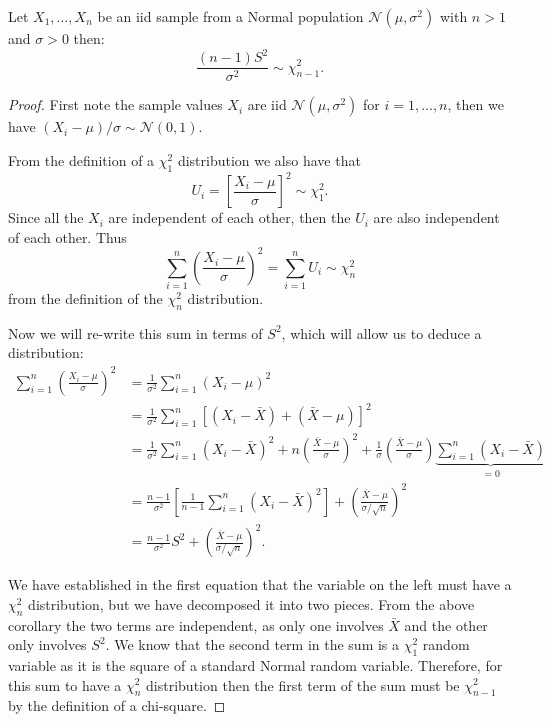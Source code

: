 \documentclass[10pt, a4paper]{article}
\begin{document}
\begin{theorem}
    Let $X_1, \dotsc, X_n$ be an iid sample from a Normal population $\mathcal{N}(\mu, \sigma ^ 2)$ with $n > 1$ and $\sigma > 0$ then:
    \[
    \frac{(n - 1)S ^ 2}{\sigma ^ 2} \sim \chi_{n - 1}^{2}.
    \]

    \begin{proof}
        First note the sample values $X_i$ are iid $\mathcal{N}(\mu, \sigma ^ 2)$ for $i = 1, \dotsc, n$,
        then we have $(X_i - \mu) / \sigma \sim \mathcal{N}(0, 1)$.

        From the definition of a $\chi_{1}^{2}$ distribution we also have that
        \[
        U_i = \left[\frac{X_i - \mu}{\sigma}\right] ^ 2 \sim \chi_{1}^{2}.
        \]
        Since all the $X_i$ are independent of each other,
        then the $U_i$ are also independent of each other.
        Thus
        \[
        \sum_{i = 1}^{n}\left(\frac{X_i - \mu}{\sigma}\right) ^ 2 = \sum_{i = 1}^{n}U_i \sim \chi_{n}^{2}
        \]
        from the definition of the $\chi_{n}^{2}$ distribution.

        Now we will re-write this sum in terms of $S ^ 2$,
        which will allow us to deduce a distribution:
        \begin{align*}
            \sum_{i = 1}^{n}\left(\frac{X_i - \mu}{\sigma}\right) ^ 2 &= \frac{1}{\sigma ^ 2}\sum_{i = 1}^{n}(X_i - \mu) ^ 2 \\
            &= \frac{1}{\sigma ^ 2}\sum_{i = 1}^{n}[(X_i - \bar{X}) + (\bar{X} - \mu)] ^ 2 \\
            &= \frac{1}{\sigma ^ 2}\sum_{i = 1}^{n}(X_i - \bar{X}) ^ 2 + n\left(\frac{\bar{X} - \mu}{\sigma}\right) ^ 2 + \frac{1}{\sigma}\left(\frac{\bar{X} - \mu}{\sigma}\right)\underbrace{\sum_{i = 1}^{n}(X_i - \bar{X})}_{= 0} \\
            &= \frac{n - 1}{\sigma ^ 2}\left[\frac{1}{n - 1}\sum_{i = 1}^{n}(X_i - \bar{X}) ^ 2\right] + \left(\frac{\bar{X} - \mu}{\sigma / \sqrt{n}}\right) ^ 2 \\
            &= \frac{n - 1}{\sigma ^ 2}S ^ 2 + \left(\frac{\bar{X} - \mu}{\sigma / \sqrt{n}}\right) ^ 2.
        \end{align*}

        We have established in the first equation that the variable on the left must have a $\chi_{n}^{2}$ distribution,
        but we have decomposed it into two pieces.
        From the above corollary the two terms are independent,
        as only one involves $\bar{X}$ and the other only involves $S ^ 2$.
        We know that the second term in the sum is a $\chi_{1}^{2}$ random variable as it is the square of a standard Normal random variable.
        Therefore,
        for this sum to have a $\chi_{n}^{2}$ distribution then the first term of the sum must be $\chi_{n - 1}^{2}$ by the definition of a chi-square.
    \end{proof}
\end{theorem}
\end{document}
